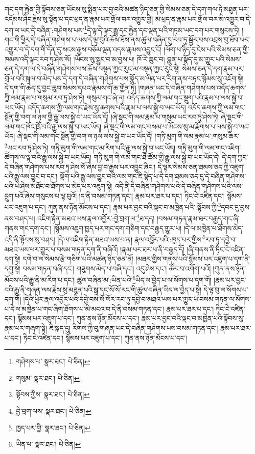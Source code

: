 གང་དག་རྐྱེན་གྱི་སྟོབས་ཅན་ཡོངས་སུ་སྨིན་པར་བྱ་བའི་མཚན་ཉིད་ཅན་གྱི་སེམས་ཅན་དེ་དག་གལ་ཏེ་མཐུན་པར་འདོམས་ཤིང་རྗེས་སུ་སྟོན་པ་དང་ཕྲད་ན་རྣམ་པར་གྲོལ་བར་འགྱུར་གྱི། མ་ཕྲད་ན་རྣམ་པར་གྲོལ་བར་མི་འགྱུར་བ་དེ་དག་ལ་ཡང་དེ་བཞིན་:གཤེགས་པས་\footnote{གཤེགས་པ་  སྣར་ཐང་།  པེ་ཅིན། }དེ་ལྟ་དེ་ལྟར་རྒྱུ་དང་རྐྱེན་དང་ལྡན་པའི་གཏམ་ཡང་དག་པར་གསུངས་ཏེ། །གང་གི་ཕྱིར་དེ་བཞིན་གཤེགས་པ་ལས་དེ་ལྟ་བུའི་ཆོས་ཐོས་ནས་ཚུལ་བཞིན་དུ་རབ་ཏུ་སྦྱོར་བས་འབྲས་བུ་ཐོབ་པར་འགྱུར་བ་དེ་དག་གི་དོན་དུ་སངས་རྒྱས་བཅོམ་ལྡན་འདས་རྣམས་འབྱུང་ངོ། །ལོག་པ་ཉིད་དུ་ངེས་པའི་སེམས་ཅན་གྱི་ཁམས་འདི་ལྟར་རབ་ཏུ་ཤེས་སོ། །ཡོངས་སུ་སྦྱང་བ་མ་བྱས་པ། ཁོ་རེ་ཆུང་བ། བླུན་པ་སྣོད་དུ་མ་གྱུར་པའི་སེམས་ཅན་དེ་དག་ལ་དེ་བཞིན་གཤེགས་པས་ཆོས་བསྟན་ཀྱང་རུང་མ་བསྟན་ཀྱང་རུང་སྟེ། སེམས་ཅན་དེ་དག་རྣམ་པར་གྲོལ་བའི་སྐལ་བ་མེད་པས་དེ་དག་དེ་བཞིན་གཤེགས་པས་སྣོད་མ་ཡིན་པར་རིག་ནས་བཏང་སྙོམས་སུ་འཇོག་སྟེ། དེ་དག་གི་ཆེད་དུ་བྱང་ཆུབ་སེམས་དཔའ་རྣམས་གོ་ཆ་གྱོན་ཏོ། །གཞན་ཡང་དེ་བཞིན་གཤེགས་པས་འདོད་ཆགས་ཀྱི་ལམ་རྣམ་པ་གསུམ་རབ་ཏུ་ཤེས་ཏེ། གསུམ་གང་ཞེ་ན། འདོད་ཆགས་ཀྱི་ལམ་གང་སྡུག་པའི་རྣམ་པ་ལས་སྐྱེ་བ་ཡང་ཡོད། འདོད་ཆགས་ཀྱི་ལམ་གང་རྗེས་སུ་ཆགས་པའི་རྣམ་པ་ལས་སྐྱེ་བ་ཡང་ཡོད། འདོད་ཆགས་ཀྱི་ལམ་གང་སྔོན་གྱི་བག་ལ་ཉལ་གྱི་རྒྱུ་ལས་སྐྱེ་བ་ཡང་ཡོད་དོ། །ཞེ་སྡང་གི་ལམ་རྣམ་པ་གསུམ་ཡང་རབ་ཏུ་ཤེས་ཏེ། ཞེ་སྡང་གི་ལམ་གང་ཁོང་ཁྲོ་བའི་རྒྱུ་ལས་སྐྱེ་བ་ཡང་ཡོད། ཞེ་སྡང་གི་ལམ་གང་བསམ་པ་ཡོངས་སུ་མ་རྫོགས་པ་ལས་སྐྱེ་བ་ཡང་ཡོད། ཞེ་སྡང་གི་ལམ་གང་སྔོན་གྱི་བག་ལ་ཉལ་ལས་སྐྱེ་བ་ཡང་ཡོད་དོ། །གཏི་མུག་གི་ལམ་རྣམ་པ་:གསུམ་ཆར་\footnote{གསུམ་  སྣར་ཐང་།  པེ་ཅིན། }ཡང་རབ་ཏུ་ཤེས་ཏེ། གཏི་མུག་གི་ལམ་གང་མ་རིག་པའི་རྒྱུ་ལས་སྐྱེ་བ་ཡང་ཡོད། གཏི་མུག་གི་ལམ་གང་འཇིག་ཚོགས་ལ་ལྟ་བའི་རྒྱུ་ལས་སྐྱེ་བ་ཡང་ཡོད། གཏི་མུག་གི་ལམ་གང་ཐེ་ཚོམ་གྱི་རྒྱུ་ལས་སྐྱེ་བ་ཡང་ཡོད་དེ། དེ་དག་ཀྱང་དེ་བཞིན་གཤེགས་པས་རབ་ཏུ་ཤེས་སོ་ཞེས་བྱ་བ་རྒྱས་པར་འབྱུང་ཞིང་། དེ་ལྟར་སེམས་ཅན་ཐམས་ཅད་ཀྱི་འཇུག་པའི་རྒྱུ་ལས་བྱུང་བ་དང་། ལྡོག་པའི་རྒྱུ་ལས་བྱུང་བའི་ལམ་གང་ཇི་སྙེད་པ་དེ་དག་ཐམས་ཅད་དུ་དེ་བཞིན་གཤེགས་པའི་ཡེ་ཤེས་མཐོང་བ་ཐོགས་པ་མེད་པར་འཇུག་སྟེ། འདི་ནི་དེ་བཞིན་གཤེགས་པའི་དེ་བཞིན་གཤེགས་པའི་ལས་དྲུག་པའོ་ཞེས་གསུངས་པ་ལྟ་བུའོ། །ད་ནི་བསམ་གཏན་དང་། རྣམ་པར་ཐར་པ་དང་། ཏིང་ངེ་འཛིན་དང་། སྙོམས་པར་འཇུག་པ་དང་། ཀུན་ནས་ཉོན་མོངས་པ་དང་། རྣམ་པར་བྱང་བའི་ལྡང་བ་མཁྱེན་པའི་:སྟོབས་ཀྱི་\footnote{སྟོབས་ཀྱིས་  སྣར་ཐང་།  པེ་ཅིན། }དབང་དུ་བྱས་ནས་བཤད་པ། འཇིག་རྟེན་མཐའ་ཡས་རྣལ་འབྱོར་:བྱེ་བྲག་ལ་\footnote{བྱེ་བྲག་ལས་  སྣར་ཐང་།  པེ་ཅིན། }ཐ་དད། །བསམ་གཏན་རྣམ་ཐར་བརྒྱད་གང་ཞི་གནས་གང་དག་དང་། །སྙོམས་འཇུག་ཁྱད་པར་གང་དག་གཅིག་དང་བརྒྱད་གྱུར་པ། །དེ་ལ་མཁྱེན་པ་ཐོགས་མེད་འདི་ནི་སྟོབས་སུ་བཤད། །དེ་ལ་འཇིག་རྟེན་མཐའ་ཡས་པ་ན། རྣལ་འབྱོར་པའི་:ཁྱད་པར་གྱིས་\footnote{ཁྱད་པར་གྱི་  སྣར་ཐང་།  པེ་ཅིན། }རབ་ཏུ་དབྱེ་བ་མཐའ་ཡས་པར་གྱུར་པ་བསམ་གཏན་དག་ནི་བཞིའོ། །རྣམ་པར་ཐར་པ་ནི་བརྒྱད་དོ། །ཞི་གནས་ནི་ཏིང་ངེ་འཛིན་དག་སྟེ། དགེ་བ་ལ་སེམས་རྩེ་གཅིག་པའི་མཚན་ཉིད་ཅན་ནོ། །མཐར་གྱིས་གནས་པའི་སྙོམས་པར་འཇུག་པ་དག་ནི་དགུ་སྟེ། བསམ་གཏན་བཞི་དང་། གཟུགས་མེད་པ་བཞི་དང་། འདུ་ཤེས་དང་། ཚོར་བ་འགོག་པའོ། །ཀུན་ནས་ཉོན་མོངས་པའི་རྒྱུ་ནི་མ་རིག་པ་དང་། ཚུལ་བཞིན་མ་:ཡིན་པའི་\footnote{ཡིན་པ་  སྣར་ཐང་།  པེ་ཅིན། }ཡིད་ལ་བྱེད་པ་ལ་སོགས་པ་དག་གོ། །རྣམ་པར་བྱང་བའི་རྒྱུ་ནི་གཞན་ལས་རྗེས་སུ་མཐུན་པའི་སྒྲ་དང་སོ་སོ་རང་གི་ཚུལ་བཞིན་ཡིད་ལ་བྱེད་པ་སྟེ། དེ་ལྟ་བུ་ལ་སོགས་པ་དག་གོ། །དེའི་ཕྱིར་རྣལ་འབྱོར་པའི་དབྱེ་བས་སོ་སོར་རབ་ཏུ་དབྱེ་བ་མཐའ་ཡས་པར་གྱུར་པ་བསམ་གཏན་ལ་སོགས་པ་དེ་ལ་མཁྱེན་པ་གང་ཞིག་ཐོགས་པ་མི་མངའ་བ་དེ་ནི་བསམ་གཏན་དང་། རྣམ་པར་ཐར་པ་དང་། ཏིང་ངེ་འཛིན་དང་། སྙོམས་པར་འཇུག་པ་དང་། ཀུན་ནས་ཉོན་མོངས་པ་དང་། རྣམ་པར་བྱང་བའི་ལྡང་བ་མཁྱེན་པའི་སྟོབས་སུ་རྣམ་པར་གཞག་སྟེ། ཇི་སྐད་དུ། རིགས་ཀྱི་བུ་གཞན་ཡང་དེ་བཞིན་གཤེགས་པས་བསམ་གཏན་དང་། རྣམ་པར་ཐར་པ་དང་། ཏིང་ངེ་འཛིན་དང་། སྙོམས་པར་འཇུག་པ་དང་། ཀུན་ནས་ཉོན་མོངས་པ་དང་། 